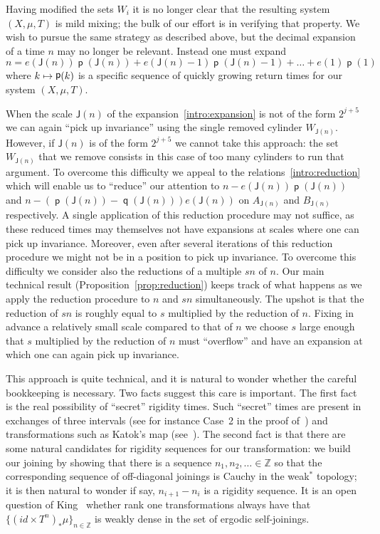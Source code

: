 \documentclass[10pt]{amsart}
\theoremstyle{definition}\newtheorem{defi}[theo]{Definition}\newtheorem{rema}[theo]{Remark}\newtheorem{exam}[theo]{Example}\newtheorem{exem}[theo]{Example}\newtheorem{nota}[theo]{Notation}
\DeclareMathOperator{\p}{\mathsf{p}}
\DeclareMathOperator{\q}{\mathsf{q}}
\newcommand{\Z}{\mathbb{Z}}
\newcommand{\scl}{\mathsf{J}}
\let\oldmapsto\mapsto
\renewcommand*{\mapsto}{\mathchoice{\longmapsto}{\oldmapsto}{\oldmapsto}{\oldmapsto}}
\begin{document}
Having modified the sets $W_i$ it is no longer clear that the resulting system $(X,\mu,T)$ is mild mixing; the bulk of our effort is in verifying that property. We wish to pursue the same strategy as described above, but the decimal expansion of a time $n$ may no longer be relevant. Instead one must expand
\begin{equation}\label{intro:expansion}
n = e(\scl(n)) \p(\scl(n)) + e(\scl(n) - 1) \p(\scl(n) - 1) + \dots + e(1) \p(1)
\end{equation}
where $k \mapsto \p(k)$ is a specific sequence of quickly growing return times for our system $(X,\mu,T)$.

When the scale $\scl(n)$ of the expansion~\eqref{intro:expansion} is not of the form $2^{j+5}$ we can again ``pick up invariance'' using the single removed cylinder $W_{\scl(n)}$. However, if $\scl(n)$ is of the form $2^{j+5}$ we cannot take this approach: the set $W_{\scl(n)}$ that we remove consists in this case of too many cylinders to run that argument. To overcome this difficulty we appeal to the relations~\eqref{intro:reduction} which will enable us to ``reduce'' our attention to $n - e(\scl(n)) \p(\scl(n))$ and $n - (\p(\scl(n)) - \q(\scl(n))) e(\scl(n))$ on $A_{\scl(n)}$ and $B_{\scl(n)}$ respectively. A single application of this reduction procedure may not suffice, as these reduced times may themselves not have expansions at scales where one can pick up invariance. Moreover, even after several iterations of this reduction procedure we might not be in a position to pick up invariance. To overcome this difficulty we consider also the reductions of a multiple $sn$ of $n$. Our main technical result (Proposition~\ref{prop:reduction}) keeps track of what happens as we apply the reduction procedure to $n$ and $sn$ simultaneously. The upshot is that the reduction of $sn$ is roughly equal to $s$ multiplied by the reduction of $n$. Fixing in advance a relatively small scale compared to that of $n$ we choose $s$ large enough that $s$ multiplied by the reduction of $n$ must ``overflow'' and have an expansion at which one can again pick up invariance.

This approach is quite technical, and it is natural to wonder whether the careful bookkeeping is necessary. Two facts suggest this care is important. The first fact is the real possibility of ``secret'' rigidity times. Such ``secret'' times are present in exchanges of three intervals (see for instance Case~2 in the proof of~\cite[Theorem~5.1]{MR2129107}) and transformations such as Katok's map (see~\cite[Section~1.4.3]{MR1436950}). The second fact is that there are some natural candidates for rigidity sequences for our transformation: we build our joining by showing that there is a sequence $n_1,n_2,\ldots\in \Z$ so that the corresponding sequence of off-diagonal joinings is Cauchy in the weak$^*$ topology; it is then natural to wonder if say, ${n_{i+1}-n_i}$ is a rigidity sequence. It is an open question of King~\cite[p.~382]{MR0863200} whether rank one transformations always have that $\{(id \times T^n)_*\mu\}_{n \in \Z}$ is weakly dense in the set of ergodic self-joinings.
\end{document}
